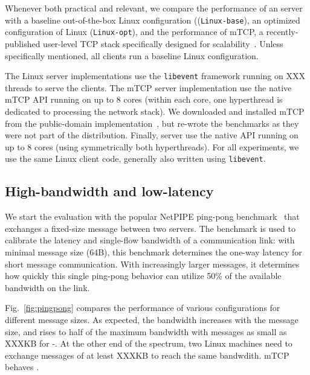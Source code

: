 
Whenever both practical and relevant, we compare the performance of an
\ix server with a baseline out-of-the-box Linux configuration
((\texttt{Linux-base}), an optimized configuration of Linux
(\texttt{Linux-opt}), and the performance of mTCP, a
recently-published user-level TCP stack specifically designed for
scalability~\cite{jeong2014mtcp}.  Unless specifically mentioned, all
clients run a baseline Linux configuration. 

The Linux server implementations use the
\texttt{libevent} framework running on XXX threads to serve the
clients. The mTCP server implementation use the native mTCP API
running on up to 8 cores (within each core, one hyperthread is
dedicated to processing the network stack).  We downloaded and installed mTCP  from the public-domain implementation~\cite{missing}, but re-wrote the benchmarks as they were not part of the distribution.
Finally, \ix server use
the native \ix API running on up to 8 cores (using symmetrically both
hyperthreads).  For all experiments, we use the same Linux client code, generally also written using \texttt{libevent}.


\subsection{High-bandwidth and low-latency}
\label{sec:eval:netpipe}




We start the evaluation with the popular NetPIPE ping-pong
benchmark~\cite{snell1996netpipe} that exchanges a fixed-size message
between two servers.  The benchmark is used to calibrate the latency
and single-flow bandwidth of a communication link: with minimal
message size (64B), this benchmark determines the one-way latency for
short message communication.  With increasingly larger messages, it
determines how quickly this single ping-pong behavior can utilize 50\%
of the available bandwidth on the link.

Fig.~\ref{fig:pingpong} compares the performance of various
configurations for different message sizes.  As expected, the
bandwidth increases with the message size, and rises to half of the
maximum bandwidth with messages as small as XXXKB for \ix-\ix.  At the
other end of the spectrum, two Linux machines need to exchange
messages of at least XXXKB to reach the same bandwdith.  mTCP behaves
.

